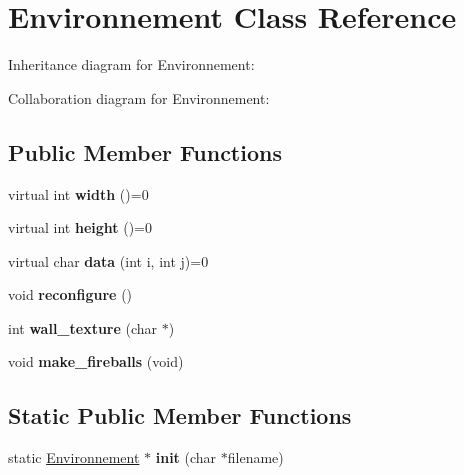 \hypertarget{classEnvironnement}{}\section{Environnement Class Reference}
\label{classEnvironnement}


Inheritance diagram for Environnement\+:


Collaboration diagram for Environnement\+:
\subsection*{Public Member Functions}
\begin{DoxyCompactItemize}
\item 
\mbox{\label{classEnvironnement_a9f5945b3cde5bd2b0d46250446989081}} 
virtual int {\bfseries width} ()=0
\item 
\mbox{\label{classEnvironnement_af7629ab7f15ec65476eadcc80c46b50c}} 
virtual int {\bfseries height} ()=0
\item 
\mbox{\label{classEnvironnement_a0fae4716da729dbf13f52f09f2d293cd}} 
virtual char {\bfseries data} (int i, int j)=0
\item 
\mbox{\label{classEnvironnement_ae0d41172775150add2e20ff9a5d94943}} 
void {\bfseries reconfigure} ()
\item 
\mbox{\label{classEnvironnement_a3e4f0241c8241d00161697b9ff167970}} 
int {\bfseries wall\+\_\+texture} (char $\ast$)
\item 
\mbox{\label{classEnvironnement_a4d16b604c6ab4cdcc3d20a6045f18c45}} 
void {\bfseries make\+\_\+fireballs} (void)
\end{DoxyCompactItemize}
\subsection*{Static Public Member Functions}
\begin{DoxyCompactItemize}
\item 
\mbox{\label{classEnvironnement_a10f6862db4b62690c262a4aea0837cf7}} 
static \hyperlink{classEnvironnement}{Environnement} $\ast$ {\bfseries init} (char $\ast$filename)
\end{DoxyCompactItemize}
